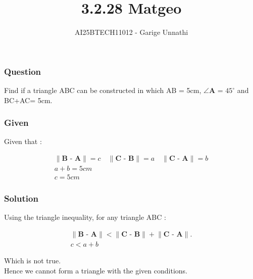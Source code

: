 \documentclass{beamer}
\title{3.2.28 Matgeo}
\author{AI25BTECH11012 - Garige Unnathi}
\date{}
\begin{document}
\frame{\titlepage}

\begin{frame}
\frametitle{Question}
Find if a triangle ABC can be constructed in which AB = 5cm, $\angle \textbf{A}$ = $45^\circ$ and BC+AC= 5cm.
\end{frame}


\begin{frame}
\frametitle{Given}
Given that : 

\begin{align*}
 \lVert \textbf{B - A}\rVert = c \quad  \lVert \textbf{C - B}\rVert = a \quad \lVert \textbf{C - A}\rVert = b\\
  a + b = 5 cm\\
  c = 5cm
\end{align*}


\end{frame}
\begin{frame}
\frametitle{Solution}
Using the triangle inequality, for any triangle ABC :



\begin{align}
    \lVert \textbf{B - A}\rVert  <   \lVert \textbf{C - B}\rVert + \lVert \textbf{C - A}\rVert.\\
    c < a+b
 \end{align}


Which is not true.\\

Hence we cannot form a triangle with the given conditions.
\end{frame}
\end{document}
